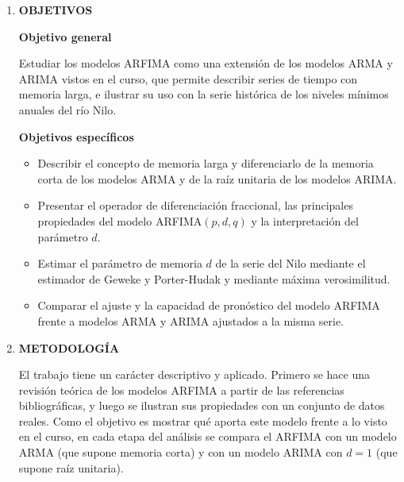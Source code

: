\documentclass[legalpaper,11pt]{article}
\begin{document}
\begin{enumerate}
Como el ARFIMA es invertible, se puede escribir como un AR$(\infty)$, $x_t = \sum_{j \ge 1} \varphi_j x_{t-j} + w_t$, y el mejor predictor lineal de $x_{n+h}$ se construye a partir de esa representaci\'on, truncada en el n\'umero de datos disponibles. La diferencia con un ARMA est\'a en c\'omo se comportan los pron\'osticos a medida que crece el horizonte $h$. En un ARMA, los pron\'osticos regresan a la media muy r\'apido, de forma exponencial. En un ARFIMA con $0<d<\tfrac{1}{2}$ tambi\'en regresan a la media, pero de forma lenta, porque el modelo ``recuerda'' lo que pas\'o hace mucho tiempo. Geweke y Porter-Hudak (1983) encontraron que, en varias series econ\'omicas, este tipo de modelos daba pron\'osticos fuera de muestra m\'as confiables que los procedimientos convencionales, y esa es una de las motivaciones pr\'acticas m\'as fuertes para usarlos.
\medskip

\item \textbf{OBJETIVOS}

\medskip
\noindent\textbf{Objetivo general}

Estudiar los modelos ARFIMA como una extensi\'on de los modelos ARMA y ARIMA vistos en el curso, que permite describir series de tiempo con memoria larga, e ilustrar su uso con la serie hist\'orica de los niveles m\'inimos anuales del r\'io Nilo.

\medskip
\noindent\textbf{Objetivos espec\'ificos}

\begin{itemize}
\item Describir el concepto de memoria larga y diferenciarlo de la memoria corta de los modelos ARMA y de la ra\'iz unitaria de los modelos ARIMA.
\item Presentar el operador de diferenciaci\'on fraccional, las principales propiedades del modelo ARFIMA$(p,d,q)$ y la interpretaci\'on del par\'ametro $d$.
\item Estimar el par\'ametro de memoria $d$ de la serie del Nilo mediante el estimador de Geweke y Porter-Hudak y mediante m\'axima verosimilitud.
\item Comparar el ajuste y la capacidad de pron\'ostico del modelo ARFIMA frente a modelos ARMA y ARIMA ajustados a la misma serie.
\end{itemize}
\medskip
\medskip

\item \textbf{METODOLOG{\'I}A}

El trabajo tiene un car\'acter descriptivo y aplicado. Primero se hace una revisi\'on te\'orica de los modelos ARFIMA a partir de las referencias bibliogr\'aficas, y luego se ilustran sus propiedades con un conjunto de datos reales. Como el objetivo es mostrar qu\'e aporta este modelo frente a lo visto en el curso, en cada etapa del an\'alisis se compara el ARFIMA con un modelo ARMA (que supone memoria corta) y con un modelo ARIMA con $d=1$ (que supone ra\'iz unitaria).


\end{enumerate}
\end{document}

